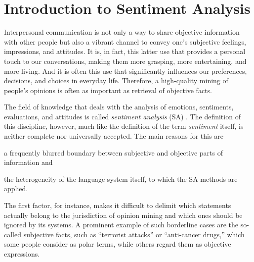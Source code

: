 


\chapter{Introduction to Sentiment Analysis}\label{chap:introduction}

Interpersonal communication is not only a way to share objective
information with other people but also a vibrant channel to convey
one's subjective feelings, impressions, and attitudes.  It is, in
fact, this latter use that provides a personal touch to our
conversations, making them more grasping, more entertaining, and more
living.  And it is often this use that significantly influences our
preferences, decisions, and choices in everyday life.  Therefore, a
high-quality mining of people's opinions is often as important as
retrieval of objective facts.

The field of knowledge that deals with the analysis of emotions,
sentiments, evaluations, and attitudes is called \emph{sentiment
  analysis} (SA) \citep{Liu:12}.  The definition of this discipline,
however, much like the definition of the term \emph{sentiment} itself,
is neither complete nor universally accepted.  The main reasons for
this are
\begin{inparaenum}[(i)]
  \item a frequently blurred boundary between subjective and objective
    parts of information and
  \item the heterogeneity of the language system itself, to which the
    SA methods are applied.
\end{inparaenum}

The first factor, for instance, makes it difficult to delimit which
statements actually belong to the jurisdiction of opinion mining and
which ones should be ignored by its systems.  A prominent example of
such borderline cases are the so-called subjective facts, such as
``terrorist attacks'' or ``anti-cancer drugs,'' which some people
consider as polar terms, while others regard them as objective
expressions.

